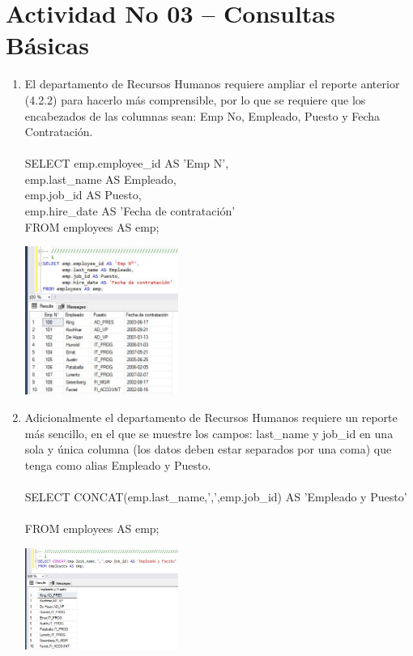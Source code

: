 \section{Actividad No 03 – Consultas B\'asicas} 
		
\begin{enumerate}[1.]
	\item El departamento de Recursos Humanos requiere ampliar el reporte anterior (4.2.2) para hacerlo m\'as comprensible, por lo que se requiere que los encabezados de las columnas sean: Emp No, Empleado, Puesto y Fecha Contrataci\'on.
	\\
	\\SELECT emp.employee\_id AS 'Emp N', \\
	   emp.last\_name AS Empleado, \\
	   emp.job\_id AS Puesto, \\
	   emp.hire\_date AS 'Fecha de contrataci\'on' \\
	FROM employees AS emp; \\
	\begin{center}
	\includegraphics[width=5cm]{./Imagenes/actividad0301} 
	\end{center}

	\item Adicionalmente el departamento de Recursos Humanos requiere un reporte más sencillo, en el que se muestre los campos: last\_name y job\_id en una sola y \'unica columna (los datos deben estar separados por una coma) que tenga como alias Empleado y Puesto.
	\\
	\\SELECT CONCAT(emp.last\_name,',',emp.job\_id) AS 'Empleado y Puesto' \\
	\\FROM employees AS emp; \\
	\begin{center}
	\includegraphics[width=5cm]{./Imagenes/actividad0302} 
	\end{center}


\end{enumerate}
